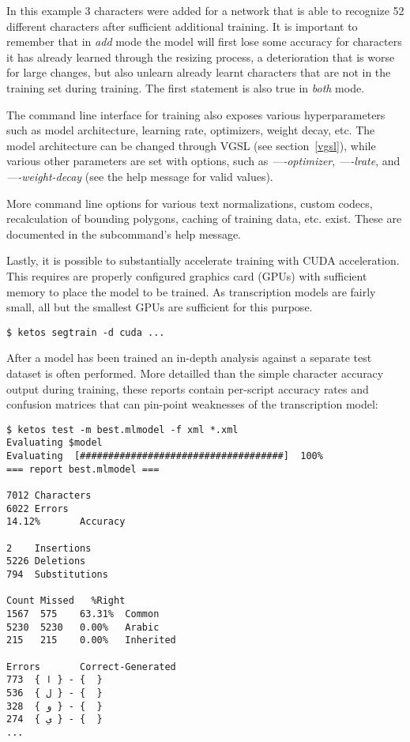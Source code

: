 In this example 3 characters were added for a network that is able to
recognize 52 different characters after sufficient additional training. It is
important to remember that in \emph{add} mode the model will first lose some
accuracy for characters it has already learned through the resizing process,
a deterioration that is worse for large changes, but also unlearn already
learnt characters that are not in the training set during training. The first
statement is also true in \emph{both} mode.

The command line interface for training also exposes various hyperparameters
such as model architecture, learning rate, optimizers, weight decay, etc. The
model architecture can be changed through VGSL (see section~\ref{vgsl}), while
various other parameters are set with options, such as \emph{----optimizer},
\emph{----lrate}, and \emph{----weight-decay} (see the help message for valid
values). 

More command line options for various text normalizations, custom codecs,
recalculation of bounding polygons, caching of training data, etc. exist. These
are documented in the subcommand's help message. 

Lastly, it is possible to substantially accelerate training with CUDA
acceleration. This requires are properly configured graphics card (GPUs) with
sufficient memory to place the model to be trained. As transcription models are
fairly small, all but the smallest GPUs are sufficient for this purpose.

\begin{verbatim}
$ ketos segtrain -d cuda ...
\end{verbatim}

After a model has been trained an in-depth analysis against a separate test
dataset is often performed. More detailled than the simple character accuracy
output during training, these reports contain per-script accuracy rates and
confusion matrices that can pin-point weaknesses of the transcription model:

\begin{verbatim}
$ ketos test -m best.mlmodel -f xml *.xml
Evaluating $model
Evaluating  [####################################]  100%
=== report best.mlmodel ===

7012 Characters
6022 Errors
14.12%       Accuracy

2    Insertions
5226 Deletions 
794  Substitutions

Count Missed   %Right
1567  575    63.31%  Common
5230  5230   0.00%   Arabic
215   215    0.00%   Inherited

Errors       Correct-Generated
773  { ﺍ } - {  }
536  { ﻝ } - {  }
328  { ﻭ } - {  }
274  { ﻱ } - {  }
...
\end{verbatim}

